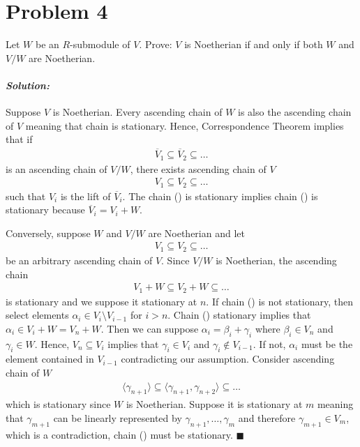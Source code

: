 \documentclass[12pt, a4paper]{article}
\theoremstyle{remark}
\newenvironment{solution}
  {\paragraph{\textit{Solution:}}\par\medskip}
  {\hfill$\blacksquare$\vspace{0.1cm}}
\begin{document}
\section*{Problem 4}
Let $W$ be an $R$-submodule of $V$. Prove: $V$ is Noetherian if and only if both $W$ and $V/W$ are Noetherian.
\begin{solution}
    Suppose $V$ is Noetherian. Every ascending chain of $W$ is also the ascending chain of $V$ meaning that chain is stationary. 
    Hence, Correspondence Theorem implies that if 
    \begin{align*}
        \overline{V}_1\subseteq \overline{V}_2\subseteq \dots  \tag{\Jupiter}
    \end{align*}
    is an ascending chain of $V/W$, there exists ascending chain of $V$
        \begin{align*}
        V_1\subseteq V_2\subseteq \dots \tag{\YinYang}
    \end{align*}
    such that $V_i$ is the lift of $\overline{V}_i$. The chain (\YinYang) is stationary implies chain (\Jupiter) is stationary because $\overline{V}_i = V_i+W$.

    Conversely, suppose $W$ and $V/W$ are Noetherian and let 
    \begin{align*}
        V_1\subseteq V_2\subseteq \dots \tag{\Gemini}
    \end{align*}
    be an arbitrary ascending chain of $V$. Since $V/W$ is Noetherian, the ascending chain 
    \begin{align*}
        V_1+W \subseteq V_2+W\subseteq \dots  \tag{\Scorpio}
    \end{align*}
    is stationary and we suppose it stationary at $n$. If chain (\Gemini) is not stationary, then select elements $\alpha_i\in V_i\setminus V_{i-1}$ for $i>n$.
    Chain (\Scorpio) stationary implies that $\alpha_i\in V_i+W = V_n+W$. Then we can suppose $\alpha_i = \beta_i+\gamma_i$ where $\beta_i\in V_n$ and $\gamma_i\in W$.
    Hence, $V_n\subseteq V_i$ implies that $\gamma_i\in V_{i}$ and $\gamma_i\notin V_{i-1}$. If not, $\alpha_i$ must be the element contained in $V_{i-1}$ contradicting our assumption.
    Consider ascending chain of $W$
    \begin{align*}
        \langle \gamma_{n+1} \rangle\subseteq \langle  \gamma_{n+1},\gamma_{n+2} \rangle \subseteq \dots
    \end{align*}
    which is stationary since $W$ is Noetherian. Suppose it is stationary at $m$ meaning that $\gamma_{m+1}$ can be linearly represented by $\gamma_{n+1},\dots,\gamma_{m}$
    and therefore $\gamma_{m+1}\in V_m$, which is a contradiction, chain (\Gemini) must be stationary.
\end{solution}
\end{document}
